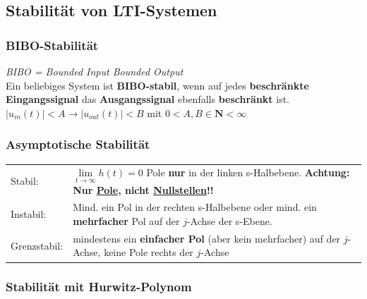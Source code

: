 		
	\newpage
	\subsection{Stabilität von LTI-Systemen}
		\renewcommand{\arraystretchOriginal}{1}
		\subsubsection{BIBO-Stabilität }
			\textit{BIBO = Bounded Input Bounded Output}\\
					Ein beliebiges System ist \textbf{BIBO-stabil}, wenn auf jedes \textbf{beschränkte Eingangssignal}
					das \textbf{Ausgangssignal} ebenfalls \textbf{beschränkt} ist.$|u_{in}(t)| < A \rightarrow |u_{out}(t)| < B$ mit $0 < A,B \in \mathbf{N} < \infty$
		
	\subsubsection{Asymptotische Stabilität }
		
			\begin{tabular}{ll}
				Stabil: 
			& 	$\lim\limits_{t\rightarrow\infty} h(t) = 0$ \qquad Pole \textbf{nur} in der linken s-Halbebene.
				\textbf{Achtung: Nur \underline{Pole}, nicht \underline{Nullstellen}!!}
			\\
				Instabil: 
			& 	Mind. ein Pol in der rechten s-Halbebene oder mind. ein \textbf{mehrfacher} Pol auf der $j$-Achse der s-Ebene.
			\\
				Grenzstabil:
			& 	mindestens ein \textbf{einfacher Pol} (aber kein mehrfacher) auf der $j$-Achse, keine Pole rechts der $j$-Achse
			\end{tabular}
		
		
		\subsubsection{Stabilität mit Hurwitz-Polynom }
		
